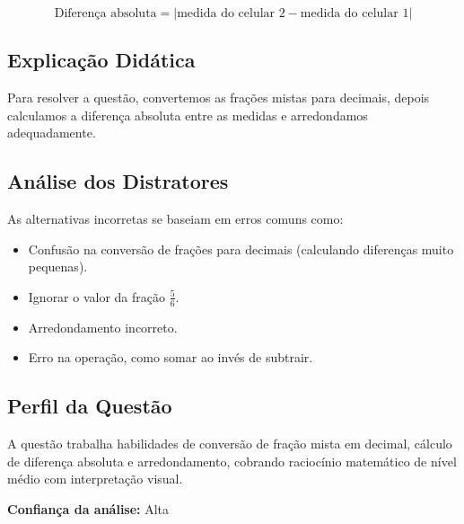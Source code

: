 \documentclass{article}
\begin{document}
\[
\text{Diferença absoluta} = \left| \text{medida do celular 2} - \text{medida do celular 1} \right|
\]

\subsection*{Explicação Didática}
Para resolver a questão, convertemos as frações mistas para decimais, depois calculamos a diferença absoluta entre as medidas e arredondamos adequadamente.

\subsection*{Análise dos Distratores}
As alternativas incorretas se baseiam em erros comuns como:
\begin{itemize}
  \item Confusão na conversão de frações para decimais (calculando diferenças muito pequenas).
  \item Ignorar o valor da fração \(\frac{5}{6}\).
  \item Arredondamento incorreto.
  \item Erro na operação, como somar ao invés de subtrair.
\end{itemize}

\subsection*{Perfil da Questão}
A questão trabalha habilidades de conversão de fração mista em decimal, cálculo de diferença absoluta e arredondamento, cobrando raciocínio matemático de nível médio com interpretação visual.

\bigskip

\textbf{Confiança da análise:} Alta
\end{document}
